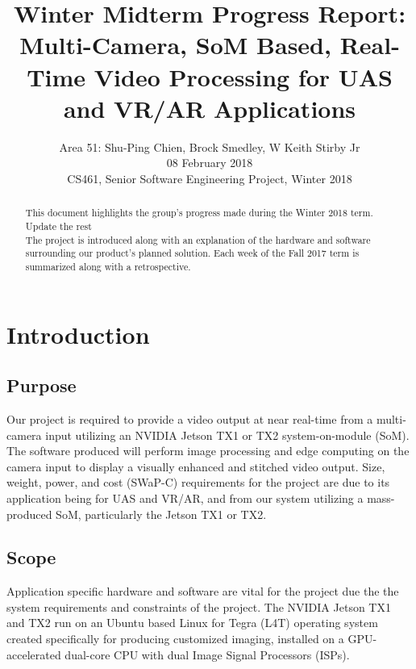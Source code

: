 \documentclass[letterpaper,10pt,serif,draftclsnofoot,onecolumn,compsoc,titlepage]{IEEEtran}
\title{Winter Midterm Progress Report: Multi-Camera, SoM Based, Real-Time Video Processing for UAS and VR/AR Applications}
\author{Area 51: Shu-Ping Chien, Brock Smedley, W Keith Stirby Jr \\ 08 February 2018 \\ CS461, Senior Software Engineering Project, Winter 2018}
\begin{document}
\begin{titlepage}
\maketitle

\begin{abstract}

This document highlights the group's progress made during the Winter 2018 term. \\
Update the rest \\
The 
project is introduced along with an explanation of the hardware and software 
surrounding our product's planned solution. Each week of the Fall 2017 term is 
summarized along with a retrospective. \\

\thispagestyle{empty}
\end{abstract}
\end{titlepage}

\newpage
\tableofcontents

\newpage

\section{Introduction}

\subsection{Purpose}
Our project is required to provide a video output at near real-time from a 
multi-camera input utilizing an NVIDIA Jetson TX1 or TX2 system-on-module (SoM). 
The software produced will perform image processing and edge computing on the 
camera input to display a visually enhanced and stitched video output. 
Size, weight, power, and cost (SWaP-C) requirements for the project are due 
to its application being for UAS and VR/AR, and from our system utilizing a 
mass-produced SoM, particularly the Jetson TX1 or TX2. \\

\subsection{Scope}
Application specific hardware and software are vital for the project due the the 
system requirements and constraints of the project.
The NVIDIA Jetson TX1 and TX2 run on an Ubuntu based Linux for Tegra (L4T) operating 
system created specifically for producing customized imaging, installed on a 
GPU-accelerated dual-core CPU with dual Image Signal Processors (ISPs). 
\end{document}
